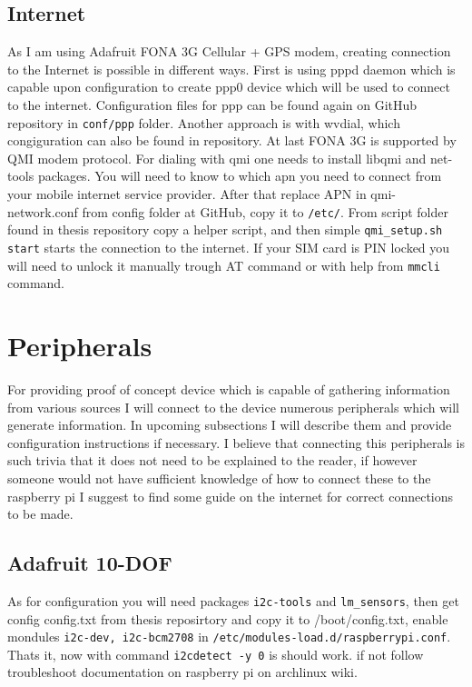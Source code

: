 \subsection{Internet} %
\label{sub:internet}
As I am using Adafruit FONA 3G Cellular + GPS modem, creating connection to the Internet is possible in different ways. First is using pppd daemon which is capable upon configuration to create ppp0 device which will be used to connect to the internet. Configuration files for ppp can be found again on GitHub repository in \verb|conf/ppp| folder. Another approach is with wvdial, which congiguration can also be found in repository. At last FONA 3G is supported by QMI modem protocol. For dialing with qmi one needs to install libqmi and net-tools packages. You will need to know to which apn you need to connect from your mobile internet service provider. After that replace APN in qmi-network.conf from config folder at GitHub, copy it to \verb|/etc/|. From script folder found in thesis repository copy a helper script, and then simple \verb|qmi_setup.sh start| starts the connection to the internet. If your SIM card is PIN locked you will need to unlock it manually trough AT command or with help from \verb|mmcli| command.
\newpage
\section{Peripherals} %
\label{sec:peripherals}
For providing proof of concept device which is capable of gathering information from various sources I will connect to the device numerous peripherals which will generate information. In upcoming subsections I will describe them and provide configuration instructions if necessary. I believe that connecting this peripherals is such trivia that it does not need to be explained to the reader, if however someone would not have sufficient knowledge of how to connect these to the raspberry pi I suggest to find some guide on the internet for correct connections to be made.
\subsection{Adafruit 10-DOF} %
\label{sub:adafruit_10_dof}
As for configuration you will need packages \verb|i2c-tools| and \verb|lm_sensors|, then get config config.txt from thesis reposirtory and copy it to /boot/config.txt, enable mondules \verb|i2c-dev, i2c-bcm2708| in \verb|/etc/modules-load.d/raspberrypi.conf|. Thats it, now with command \verb|i2cdetect -y 0| is should work. if not follow troubleshoot documentation on raspberry pi on archlinux wiki.
